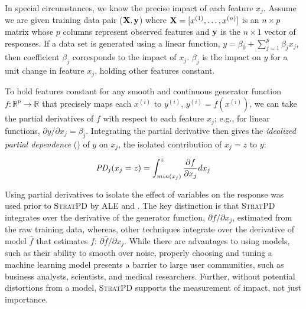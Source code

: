 \documentclass[11pt]{article}
\newcommand{\cut}[1]{}
\newcommand{\spd}{\fontfamily{cmr}\textsc{\small StratPD}}
\renewcommand{\xi}{x^{(i)}}
\begin{document}
\cut{Practitioners loosely define feature importance as feature predictiveness, which presupposes a fitted predictive model, probably because importances are so often used for feature selection during model development.  Research  focuses on more accurately identifying the impact of features upon model predictions.  But, relying on a fitted model makes it difficult to tease apart the true feature importance from the ability of the model to exploit that feature for prediction purposes. Rather than measuring feature impact on {\em model predictions}, we propose avoiding the model completely to define feature importance as the average impact of a feature on the {\em data set response values}.}

In special circumstances, we know the precise impact of each feature $x_j$. Assume we are given training data pair ($\bf X, y$) where ${\bf X} = [x^{(1)}, \ldots, x^{(n)}]$ is an $n \times p$ matrix whose $p$ columns represent observed features and ${\bf y}$ is the $n \times 1$ vector of responses.  If a data set is generated using a linear function, $y = \beta_0 + \sum_{j=1}^p \beta_j x_j$, then coefficient $\beta_j$ corresponds  to the impact of $x_j$.  $\beta_j$ is the impact on $y$ for a unit change in feature $x_j$, holding other features constant.

To hold features constant for any smooth and continuous generator function $f:\mathbb{R}^{p} \rightarrow \mathbb{R}$ that precisely maps each $\xi$ to $y^{(i)}$, ${y^{(i)}} = f(\xi)$, we can take the partial derivatives of $f$ with respect to each feature $x_j$; e.g., for linear functions, ${\partial y}/{\partial x_j}=\beta_j$. Integrating the partial derivative then gives the {\em idealized partial dependence} (\citealt{stratpd}) of $y$ on $x_j$, the isolated contribution of $x_j = z$ to $y$:

\begin{equation}\label{eq:pd}
\text{\it PD}_j(x_j = z) = \int_{min(x_j)}^z \frac{\partial f}{\partial x_j} dx_j
\end{equation}

Using partial derivatives to isolate the effect of variables on the response was used prior to \spd{} by ALE and \cite{intgrad}. The key distinction is that  \spd{} integrates over the derivative of the generator function, ${\partial f}/{\partial x_j}$, estimated from the raw training data, whereas, other techniques integrate over the derivative of model $\hat{f}$ that estimates $f$: ${\partial \hat{f}}/{\partial x_j}$. While there are advantages to using models, such as their ability to smooth over noise, properly choosing and tuning a machine learning model presents a barrier to large user communities, such as business analysts, scientists, and medical researchers. Further, without potential distortions from a model, \spd{} supports the measurement of impact, not just importance.
\end{document}

